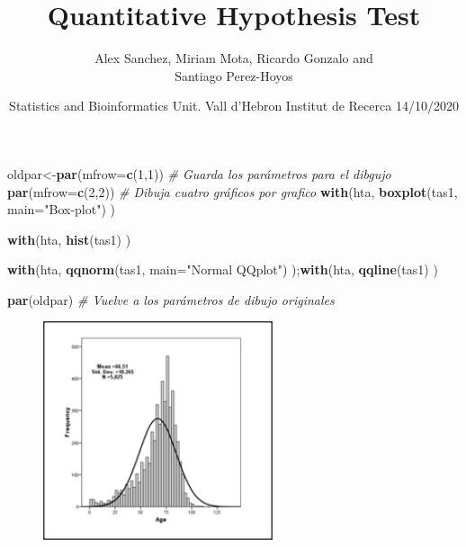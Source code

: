 \documentclass[
  ignorenonframetext,
]{beamer}
\title{Quantitative Hypothesis Test}
\author{Alex Sanchez, Miriam Mota, Ricardo Gonzalo and\\
Santiago Perez-Hoyos}
\date{Statistics and Bioinformatics Unit. Vall d'Hebron Institut de Recerca
14/10/2020}
\newenvironment{Shaded}{\begin{snugshade}}{\end{snugshade}}
\newcommand{\CommentTok}[1]{\textcolor[rgb]{0.56,0.35,0.01}{\textit{#1}}}
\newcommand{\DataTypeTok}[1]{\textcolor[rgb]{0.13,0.29,0.53}{#1}}
\newcommand{\DecValTok}[1]{\textcolor[rgb]{0.00,0.00,0.81}{#1}}
\newcommand{\KeywordTok}[1]{\textcolor[rgb]{0.13,0.29,0.53}{\textbf{#1}}}
\newcommand{\NormalTok}[1]{#1}
\newcommand{\StringTok}[1]{\textcolor[rgb]{0.31,0.60,0.02}{#1}}
\begin{document}
\frame{\titlepage}

\begin{frame}[fragile]

\tiny

\begin{Shaded}
\begin{Highlighting}[]
\NormalTok{oldpar<-}\KeywordTok{par}\NormalTok{(}\DataTypeTok{mfrow=}\KeywordTok{c}\NormalTok{(}\DecValTok{1}\NormalTok{,}\DecValTok{1}\NormalTok{)) }\CommentTok{# Guarda los parámetros para el dibgujo}
\KeywordTok{par}\NormalTok{(}\DataTypeTok{mfrow=}\KeywordTok{c}\NormalTok{(}\DecValTok{2}\NormalTok{,}\DecValTok{2}\NormalTok{)) }\CommentTok{# Dibuja cuatro gráficos por grafico}
\KeywordTok{with}\NormalTok{(hta, }\KeywordTok{boxplot}\NormalTok{(tas1, }\DataTypeTok{main=}\StringTok{"Box-plot"}\NormalTok{) )}

\KeywordTok{with}\NormalTok{(hta, }\KeywordTok{hist}\NormalTok{(tas1) )}

\KeywordTok{with}\NormalTok{(hta, }\KeywordTok{qqnorm}\NormalTok{(tas1, }\DataTypeTok{main=}\StringTok{"Normal QQplot"}\NormalTok{) );}\KeywordTok{with}\NormalTok{(hta, }\KeywordTok{qqline}\NormalTok{(tas1) )}

\KeywordTok{par}\NormalTok{(oldpar) }\CommentTok{# Vuelve a los parámetros de dibujo originales}
\end{Highlighting}
\end{Shaded}

\begin{figure}
\includegraphics[width=0.8\linewidth]{images/normalityplot} \end{figure}

\end{frame}
\end{document}
